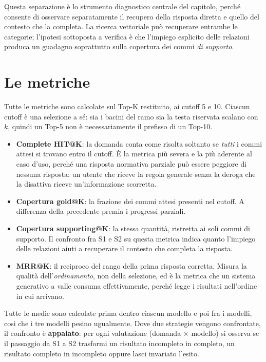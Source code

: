 Questa separazione è lo strumento diagnostico centrale del capitolo, perché consente di osservare separatamente il recupero della risposta diretta e quello del contesto che la completa. La ricerca vettoriale può recuperare entrambe le categorie; l'ipotesi sottoposta a verifica è che l'impiego esplicito delle relazioni produca un guadagno soprattutto sulla copertura dei commi \textit{di supporto}.

\section{Le metriche}
\label{sec:metriche}

Tutte le metriche sono calcolate sul Top-K restituito, ai cutoff 5 e 10. Ciascun cutoff è una selezione a sé: sia i bacini del ramo sia la testa riservata scalano con $k$, quindi un Top-5 non è necessariamente il prefisso di un Top-10.

\begin{itemize}
    \item \textbf{Complete HIT@K}: la domanda conta come risolta soltanto se \textit{tutti} i commi attesi si trovano entro il cutoff. È la metrica più severa e la più aderente al caso d'uso, perché una risposta normativa parziale può essere peggiore di nessuna risposta: un utente che riceve la regola generale senza la deroga che la disattiva riceve un'informazione scorretta.
    \item \textbf{Copertura gold@K}: la frazione dei commi attesi presenti nel cutoff. A differenza della precedente premia i progressi parziali.
    \item \textbf{Copertura supporting@K}: la stessa quantità, ristretta ai soli commi di supporto. Il confronto fra S1 e S2 su questa metrica indica quanto l'impiego delle relazioni aiuti a recuperare il contesto che completa la risposta.
    \item \textbf{MRR@K}: il reciproco del rango della prima risposta corretta. Misura la qualità dell'\textit{ordinamento}, non della selezione, ed è la metrica che un sistema generativo a valle consuma effettivamente, perché legge i risultati nell'ordine in cui arrivano.
\end{itemize}

Tutte le medie sono calcolate prima dentro ciascun modello e poi fra i modelli, così che i tre modelli pesino ugualmente. Dove due strategie vengono confrontate, il confronto è \textbf{appaiato}: per ogni valutazione (domanda $\times$ modello) si osserva se il passaggio da S1 a S2 trasformi un risultato incompleto in completo, un risultato completo in incompleto oppure lasci invariato l'esito.

